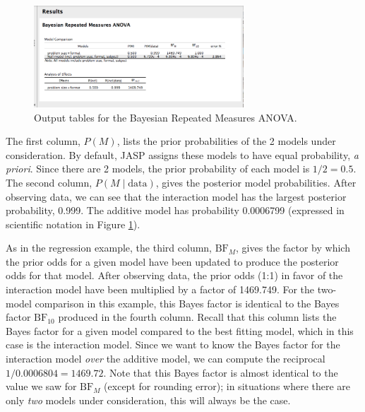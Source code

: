 \documentclass[english,,doc,floatsintext]{apa6}
\begin{document}
\begin{figure}[htbp]
\centering
\includegraphics[width=0.7\textwidth,height=\textheight]{figures/repeatedMeasures3.png}
\caption{\label{fig:repeatedMeasures3}Output tables for the Bayesian Repeated Measures ANOVA.}
\end{figure}

The first column, \(P(M)\), lists the prior probabilities of the 2 models under consideration. By default, JASP assigns these models to have equal probability, \emph{a priori}. Since there are 2 models, the prior probability of each model is \(1/2 = 0.5\). The second column, \(P(M\mid \text{data})\), gives the posterior model probabilities. After observing data, we can see that the interaction model has the largest posterior probability, 0.999. The additive model has probability 0.0006799 (expressed in scientific notation in Figure \ref{fig:repeatedMeasures3}).

As in the regression example, the third column, \(\text{BF}_{M}\), gives the factor by which the prior odds for a given model have been updated to produce the posterior odds for that model. After observing data, the prior odds (1:1) in favor of the interaction model have been multiplied by a factor of 1469.749. For the two-model comparison in this example, this Bayes factor is identical to the Bayes factor \(\text{BF}_{10}\) produced in the fourth column. Recall that this column lists the Bayes factor for a given model compared to the best fitting model, which in this case is the interaction model. Since we want to know the Bayes factor for the interaction model \emph{over} the additive model, we can compute the reciprocal \(1/0.0006804 = 1469.72\). Note that this Bayes factor is almost identical to the value we saw for \(\text{BF}_{M}\) (except for rounding error); in situations where there are only \emph{two} models under consideration, this will always be the case.
\end{document}
